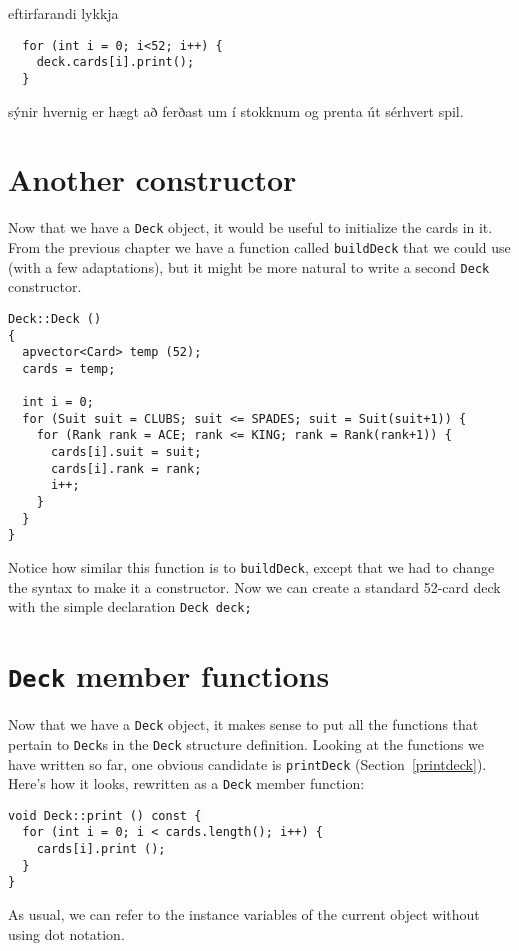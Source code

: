 eftirfarandi lykkja

\begin{verbatim}
  for (int i = 0; i<52; i++) {
    deck.cards[i].print();
  }
\end{verbatim}
%
sýnir hvernig er hægt að ferðast um í stokknum og prenta út sérhvert spil.

\section {Another constructor}

Now that we have a {\tt Deck} object, it would be useful
to initialize the cards in it.  From the previous chapter we
have a function called {\tt buildDeck} that we could use
(with a few adaptations), but it might be more natural to
write a second {\tt Deck} constructor.


\begin{verbatim}
Deck::Deck ()
{
  apvector<Card> temp (52);
  cards = temp;

  int i = 0;
  for (Suit suit = CLUBS; suit <= SPADES; suit = Suit(suit+1)) {
    for (Rank rank = ACE; rank <= KING; rank = Rank(rank+1)) {
      cards[i].suit = suit;
      cards[i].rank = rank;
      i++;
    }
  }
}
\end{verbatim}
%
Notice how similar this function is to {\tt buildDeck}, except
that we had to change the syntax to make it a constructor.
Now we can create a standard 52-card deck with the simple
declaration {\tt Deck deck;}

\section {{\tt Deck} member functions}

Now that we have a {\tt Deck} object, it makes sense to put
all the functions that pertain to {\tt Deck}s in the {\tt Deck}
structure definition.  Looking at the functions we have written so
far, one obvious candidate is {\tt printDeck} (Section~\ref{printdeck}).
Here's how it looks, rewritten as a {\tt Deck} member function:


\begin{verbatim}
void Deck::print () const {
  for (int i = 0; i < cards.length(); i++) {
    cards[i].print ();
  }
}
\end{verbatim}
%
As usual, we can refer to the instance variables of the current
object without using dot notation.


